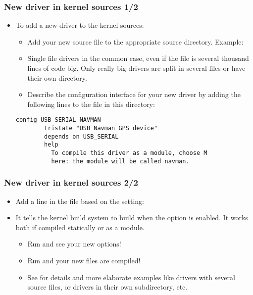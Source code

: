 \begin{frame}[fragile]
  \frametitle{New driver in kernel sources 1/2}
  \begin{itemize}
  \item To add a new driver to the kernel sources:
    \begin{itemize}
    \item Add your new source file to the appropriate source
      directory. Example: 
    \item Single file drivers in the common case, even if the file is
      several thousand lines of code big. Only really big drivers are
      split in several files or have their own directory.
    \item Describe the configuration interface for your new driver by
      adding the following lines to the  file in this
      directory:
    \end{itemize}
{\footnotesize
\begin{block}{}
\begin{verbatim}
config USB_SERIAL_NAVMAN
        tristate "USB Navman GPS device"
        depends on USB_SERIAL
        help
          To compile this driver as a module, choose M
          here: the module will be called navman.
\end{verbatim}
\end{block}
}
  \end{itemize}
\end{frame}

\begin{frame}
  \frametitle{New driver in kernel sources 2/2}
  \begin{itemize}
  \item Add a line in the  file based on the
 setting:
  \item It tells the kernel build system to build  when the
     option is enabled. It works both if
    compiled statically or as a module.
    \begin{itemize}
    \item Run  and see your new options!
    \item Run  and your new files are compiled!
    \item See  for details and more
      elaborate examples like drivers with several source files, or
      drivers in their own subdirectory, etc.
    \end{itemize}
  \end{itemize}
\end{frame}

